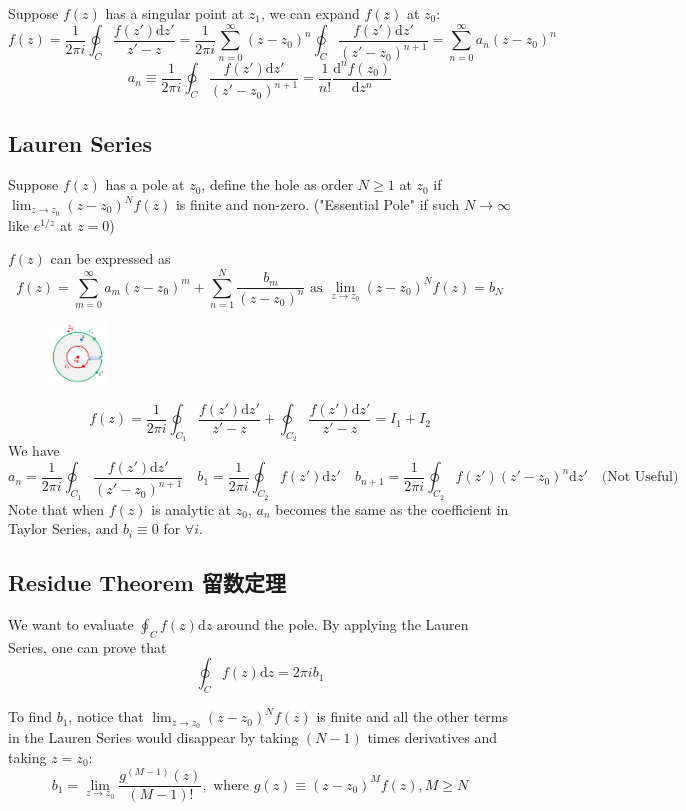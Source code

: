 \documentclass[10pt]{article}
\newcommand{\dd}{\mathrm{d}}
\begin{document}
Suppose $f(z)$ has a singular point at $z_1$, we can expand $f(z)$ at $z_0$:
$$
f(z) = \frac{1}{2\pi i} \oint_C \frac{f(z')\dd z'}{z'-z} = \frac{1}{2\pi i} \sum_{n=0}^{\infty} (z-z_0)^n \oint_C \frac{f(z')\dd z'}{(z'-z_0)^{n+1}} = \sum_{n=0}^{\infty} a_n (z-z_0)^n
$$
$$
a_n \equiv \frac{1}{2\pi i} \oint_C \frac{f(z')\dd z'}{(z'-z_0)^{n+1}} = \frac{1}{n!} \frac{\dd^n f(z_0)}{\dd z^n}
$$

\subsection{Lauren Series}

Suppose $f(z)$ has a pole at $z_0$, define the hole as order $N \geq 1$ at $z_0$ if $\lim_{z\to z_0} (z-z_0)^N f(z)$ is finite and non-zero. ("Essential Pole" if such $N\to\infty$ like $e^{1/z}$ at $z=0$)

$f(z)$ can be expressed as
$$
f(z) = \sum_{m=0}^\infty a_m (z-z_0)^m + \sum_{n=1}^N \frac{b_m}{(z-z_0)^n} \text{ as } \lim_{z\to z_0} (z-z_0)^N f(z) = b_N
$$
\begin{figure}
	\centering
	\includegraphics[width=0.14\textwidth]{img3-2}
\end{figure}
$$
f(z) = \frac{1}{2\pi i} \oint_{C_1} \frac{f(z')\dd z'}{z'-z} + \oint_{C_2} \frac{f(z')\dd z'}{z'-z} = I_1 + I_2
$$
We have
$$
a_n = \frac{1}{2\pi i} \oint_{C_1} \frac{f(z')\dd z'}{(z'-z_0)^{n+1}} \quad b_1 = \frac{1}{2\pi i} \oint_{C_2} f(z')\dd z' \quad b_{n+1} = \frac{1}{2\pi i} \oint_{C_2} f(z')(z'-z_0)^n\dd z' \quad \text{(Not Useful)}
$$
Note that when $f(z)$ is analytic at $z_0$, $a_n$ becomes the same as the coefficient in Taylor Series, and $b_i \equiv 0$ for $\forall i$.

\subsection{Residue Theorem 留数定理}
We want to evaluate $\oint_C f(z) \dd z$ around the pole. By applying the Lauren Series, one can prove that
$$
\oint_C f(z) \dd z = 2\pi i b_1
$$

\newpage

To find $b_1$, notice that $\lim_{z\to z_0} (z-z_0)^N f(z)$ is finite and all the other terms in the Lauren Series would disappear by taking $(N-1)$ times derivatives and taking $z = z_0$:
$$
b_1 = \lim_{z\to z_0} \frac{g^{(M-1)}(z)}{(M-1)!}, \text{ where } g(z) \equiv (z-z_0)^M f(z), M\geq N
$$
\end{document}

